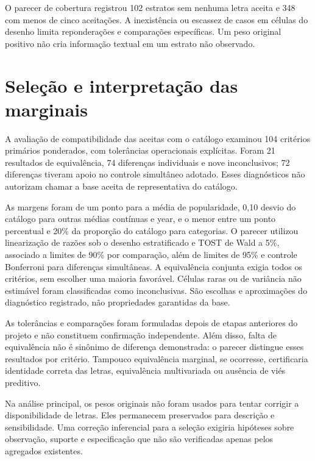 \FloatBarrier

O parecer de cobertura registrou 102 estratos sem nenhuma letra aceita e 348 com menos de cinco aceitações. A inexistência ou escassez de casos em células do desenho limita reponderações e comparações específicas. Um peso original positivo não cria informação textual em um estrato não observado.

\section{Seleção e interpretação das marginais}
A avaliação de compatibilidade das aceitas com o catálogo examinou 104 critérios primários ponderados, com tolerâncias operacionais explícitas. Foram 21 resultados de equivalência, 74 diferenças individuais e nove inconclusivos; 72 diferenças tiveram apoio no controle simultâneo adotado. Esses diagnósticos não autorizam chamar a base aceita de representativa do catálogo.

As margens foram de um ponto para a média de popularidade, 0,10 desvio do catálogo para outras médias contínuas e year, e o menor entre um ponto percentual e 20\% da proporção do catálogo para categorias. O parecer utilizou linearização de razões sob o desenho estratificado e TOST de Wald a 5\%, associado a limites de 90\% por comparação, além de limites de 95\% e controle Bonferroni para diferenças simultâneas. A equivalência conjunta exigia todos os critérios, sem escolher uma maioria favorável. Células raras ou de variância não estimável foram classificadas como inconclusivas. São escolhas e aproximações do diagnóstico registrado, não propriedades garantidas da base.

As tolerâncias e comparações foram formuladas depois de etapas anteriores do projeto e não constituem confirmação independente. Além disso, falta de equivalência não é sinônimo de diferença demonstrada: o parecer distingue esses resultados por critério. Tampouco equivalência marginal, se ocorresse, certificaria identidade correta das letras, equivalência multivariada ou ausência de viés preditivo.

Na análise principal, os pesos originais não foram usados para tentar corrigir a disponibilidade de letras. Eles permanecem preservados para descrição e sensibilidade. Uma correção inferencial para a seleção exigiria hipóteses sobre observação, suporte e especificação que não são verificadas apenas pelos agregados existentes.

